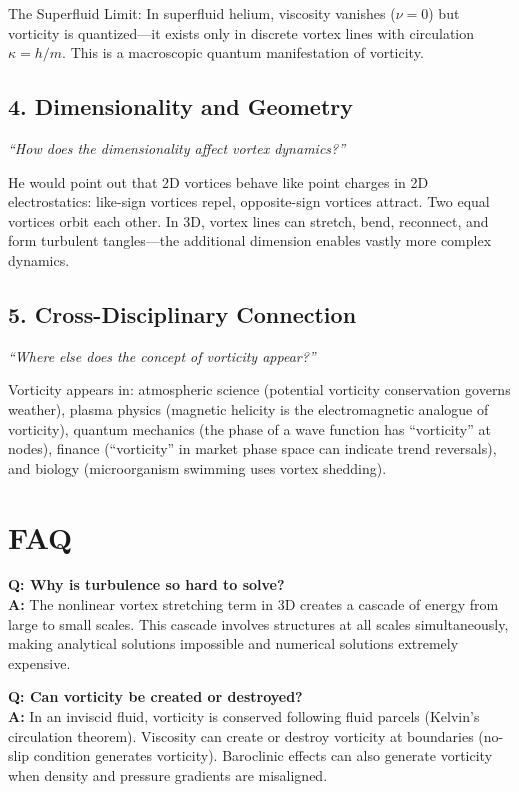 The Superfluid Limit: In superfluid helium, viscosity vanishes ($\nu = 0$) but vorticity is quantized---it exists only in discrete vortex lines with circulation $\kappa = h/m$. This is a macroscopic quantum manifestation of vorticity.

\subsection*{4. Dimensionality and Geometry}
\textit{``How does the dimensionality affect vortex dynamics?''}

He would point out that 2D vortices behave like point charges in 2D electrostatics: like-sign vortices repel, opposite-sign vortices attract. Two equal vortices orbit each other. In 3D, vortex lines can stretch, bend, reconnect, and form turbulent tangles---the additional dimension enables vastly more complex dynamics.

\subsection*{5. Cross-Disciplinary Connection}
\textit{``Where else does the concept of vorticity appear?''}

Vorticity appears in: atmospheric science (potential vorticity conservation governs weather), plasma physics (magnetic helicity is the electromagnetic analogue of vorticity), quantum mechanics (the phase of a wave function has ``vorticity'' at nodes), finance (``vorticity'' in market phase space can indicate trend reversals), and biology (microorganism swimming uses vortex shedding).
\section*{FAQ}

\textbf{Q: Why is turbulence so hard to solve?}\\
\textbf{A:} The nonlinear vortex stretching term in 3D creates a cascade of energy from large to small scales. This cascade involves structures at all scales simultaneously, making analytical solutions impossible and numerical solutions extremely expensive.

\textbf{Q: Can vorticity be created or destroyed?}\\
\textbf{A:} In an inviscid fluid, vorticity is conserved following fluid parcels (Kelvin's circulation theorem). Viscosity can create or destroy vorticity at boundaries (no-slip condition generates vorticity). Baroclinic effects can also generate vorticity when density and pressure gradients are misaligned.
